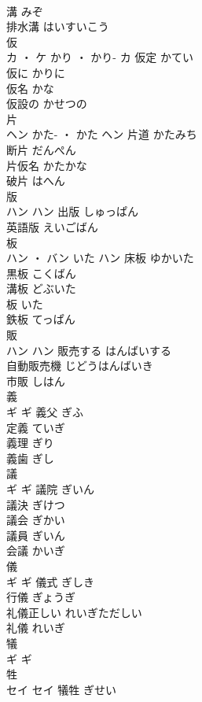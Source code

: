 \documentclass[8pt]{extreport}
\begin{document}
\begin{CJK}{UTF8}{min}
\\	溝	みぞ	
\\	排水溝	はいすいこう	
\\	仮	
\\	カ ・ ケ	かり ・ かり-	カ	仮定	かてい	
\\	仮に	かりに	
\\	仮名	かな	
\\	仮設の	かせつの	
\\	片	
\\	ヘン	かた- ・ かた	ヘン	片道	かたみち	
\\	断片	だんぺん	
\\	片仮名	かたかな	
\\	破片	はへん	
\\	版	
\\	ハン		ハン	出版	しゅっぱん	
\\	英語版	えいごばん	
\\	板	
\\	ハン ・ バン	いた	ハン	床板	ゆかいた	
\\	黒板	こくばん	
\\	溝板	どぶいた	
\\	板	いた	
\\	鉄板	てっぱん	
\\	販	
\\	ハン		ハン	販売する	はんばいする	
\\	自動販売機	じどうはんばいき	
\\	市販	しはん	
\\	義	
\\	ギ		ギ	義父	ぎふ	
\\	定義	ていぎ	
\\	義理	ぎり	
\\	義歯	ぎし	
\\	議	
\\	ギ		ギ	議院	ぎいん	
\\	議決	ぎけつ	
\\	議会	ぎかい	
\\	議員	ぎいん	
\\	会議	かいぎ	
\\	儀	
\\	ギ		ギ	儀式	ぎしき	
\\	行儀	ぎょうぎ	
\\	礼儀正しい	れいぎただしい	
\\	礼儀	れいぎ	
\\	犠	
\\	ギ		ギ																																			
\\	牲	
\\	セイ		セイ	犠牲	ぎせい	

\end{CJK}
\end{document}
